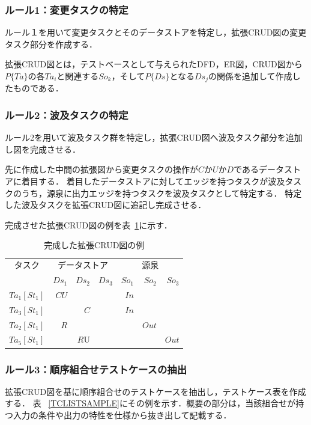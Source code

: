 \documentclass[10pt,a4j]{jarticle}
\begin{document}
\subsubsection{ルール1：変更タスクの特定}
ルール１を用いて変更タスクとそのデータストアを特定し，拡張CRUD図の変更タスク部分を作成する．

拡張CRUD図とは，テストベースとして与えられたDFD，ER図，CRUD図から$P\{Ta\}$の各$Ta_i$と関連する$So_k$，そして$P\{Ds\}$となる$Ds_j$の関係を追加して作成したものである．


\subsubsection{ルール2：波及タスクの特定}
ルール2を用いて波及タスク群を特定し，拡張CRUD図へ波及タスク部分を追加し図を完成させる．

先に作成した中間の拡張図から変更タスクの操作が$C$か$U$か$D$であるデータストアに着目する．
着目したデータストアに対してエッジを持つタスクが波及タスクのうち，源泉に出力エッジを持つタスクを波及タスクとして特定する．
特定した波及タスクを拡張CRUD図に追記し完成させる．

完成させた拡張CRUD図の例を表~\ref{excrud}に示す．
\begin{table}[t]
  \centering
  \caption{完成した拡張CRUD図の例}
    \begin{tabular}{r|r|r|r|r|r|r}
    \multicolumn{1}{c|}{タスク} & \multicolumn{3}{c|}{データストア} & \multicolumn{3}{c}{源泉} \\
\cline{2-7}    \multicolumn{1}{c|}{} & $Ds_1$ & $Ds_2$ & $Ds_3$ & $So_1$ & $So_2$ & $So_3$ \\
    \hline
    \hline
    $Ta_1[St_1]$ & $CU$ &   &   & $In$ &   &  \\
    \hline
    $Ta_3[St_1]$ &   & $C$ &   & $In$ &   &  \\
    \hline
    $Ta_2[St_1]$ & $R$ &   &   &   & $Out$ &  \\
    \hline
    $Ta_5[St_1]$ &   & $R$U &   &   &   & $Out$ \\
    \end{tabular}%
  \label{excrud}%
\end{table}%

\subsubsection{ルール3：順序組合せテストケースの抽出}
拡張CRUD図を基に順序組合せのテストケースを抽出し，テストケース表を作成する．
表 ~\ref{TCLISTSAMPLE}にその例を示す．概要の部分は，当該組合せが持つ入力の条件や出力の特性を仕様から抜き出して記載する．
\end{document}
